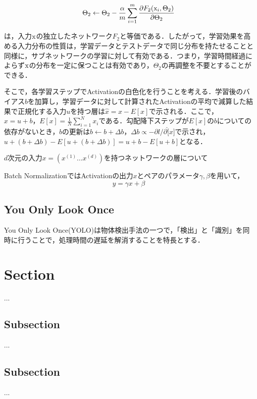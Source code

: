 \documentclass[11pt,a4paper]{jsarticle}
\begin{document}
\begin{equation}
	\Theta_2 \leftarrow \Theta_2 - \frac{\alpha}{m}\sum_{i=1}^{m}\frac{\partial F_2({\rm x}_i, \Theta_2)}{\partial \Theta_2}
\end{equation}

は，入力${\rm x}$の独立したネットワーク$F_2$と等価である．したがって，学習効果を高める入力分布の性質は，学習データとテストデータで同じ分布を持たせることと同様に，サブネットワークの学習に対して有効である．つまり，学習時間経過によらず${\rm x}$の分布を一定に保つことは有効であり，$\Theta_2$の再調整を不要とすることができる．

そこで，各学習ステップでActivationの白色化を行うことを考える．学習後のバイアス$b$を加算し，学習データに対して計算されたActivationの平均で減算した結果で正規化する入力$u$を持つ層は$\hat{x}=x-E[x]$で示される．ここで，$x=u+b，E[x]=\frac{1}{N}\sum_{i=1}^{N}x_i$である．勾配降下ステップが$E[x]$の$b$についての依存がないとき，$b$の更新は$b \leftarrow b+\Delta b$，$\Delta b \propto -\partial l / \partial \hat[x]$で示され，$u+(b+\Delta b)-E[u+(b+\Delta b)]=u+b-E[u+b]$となる．

$d$次元の入力$x=(x^(1) ... x^(d))$を持つネットワークの層について


Batch NormalizationではActivationの出力$x$とペアのパラメータ$\gamma, \beta$を用いて，
\begin{equation}
	y = \gamma x + \beta
\end{equation}

\subsection{You Only Look Once}
You Only Look Once(YOLO)は物体検出手法の一つで，「検出」と「識別」を同時に行うことで，処理時間の遅延を解消することを特長とする．



\section{Section}
...

\subsection{Subsection}
...

\subsection{Subsection}
...
\end{document}
